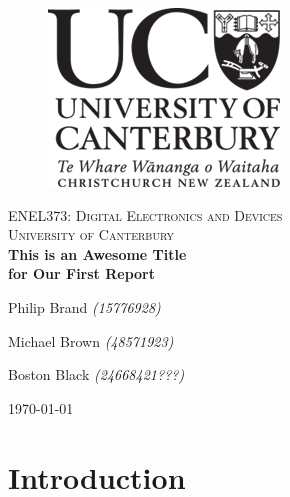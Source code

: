 \documentclass[11pt]{article}
\begin{document}
\begin{titlepage}
    \begin{center}
      \begin{figure}
        \includegraphics[right]{logo.png}
      \end{figure}
      \vspace*{1cm}
      \textsc{\large ENEL373: Digital Electronics and Devices}\\[0.5cm]
      \textsc{\Large University of Canterbury}\\[3.5cm]
      \linespread{1}
      {\Huge\bfseries This is an Awesome Title \\[0.3cm] for Our First Report} \\
      \vspace*{2cm}
      {\Huge Philip Brand \textit{\Large(15776928)}\\\par}
      {\Huge Michael Brown \textit{\Large(48571923)}\\\par}
      {\Huge Boston Black \textit{\Large(24668421???)}\\\par}
      \vspace*{3cm}
      {\LARGE \today}
    \end{center}
  \end{titlepage}
\restoregeometry

\fancyhead{}
\fancyhead[R]{\small{\today}}


\renewcommand{\baselinestretch}{1.3}\normalsize
\setlength{\cftbeforesecskip}{0.3em}
\renewcommand{\cftsecleader}{\cftdotfill{\cftdotsep}}
\tableofcontents\thispagestyle{fancy}
\renewcommand{\baselinestretch}{1}\normalsize

\newpage
{}

\section{Introduction}
\end{document}
